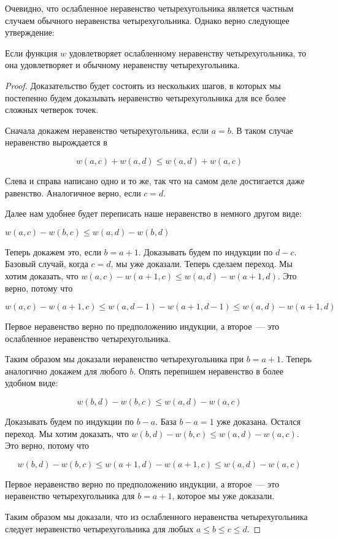 Очевидно, что ослабленное неравенство четырехугольника является частным случаем обычного неравенства четырехугольника. Однако верно следующее утверждение:

\begin{proposition}
    Если функция $w$ удовлетворяет ослабленному неравенству четырехугольника, то она удовлетворяет и обычному неравенству четырехугольника.
\end{proposition}

\begin{proof}
    Доказательство будет состоять из нескольких шагов, в которых мы постепенно будем доказывать неравенство четырехугольника для все более сложных четверок точек.

    Сначала докажем неравенство четырехугольника, если $a = b$. В таком случае неравенство вырождается в

    $$w(a, c) + w(a, d) \le w(a, d) + w(a, c)$$

    Слева и справа написано одно и то же, так что на самом деле достигается даже равенство. Аналогичное верно, если $c = d$.

    Далее нам удобнее будет переписать наше неравенство в немного другом виде:

    $w(a, c) - w(b, c) \le w(a, d) - w(b, d)$

    Теперь докажем это, если $b = a + 1$. Доказывать будем по индукции по $d - c$. Базовый случай, когда $c = d$, мы уже доказали. Теперь сделаем переход. Мы хотим доказать, что $w(a, c) - w(a + 1, c) \le w(a, d) - w(a + 1, d)$. Это верно, потому что

$$w(a, c) - w(a + 1, c) \le w(a, d - 1) - w(a + 1, d - 1) \le w(a, d) - w(a + 1, d)$$

Первое неравенство верно по предположению индукции, а второе~--- это ослабленное неравенство четырехугольника.

Таким образом мы доказали неравенство четырехугольника при $b = a + 1$. Теперь аналогично докажем для любого $b$. Опять перепишем неравенство в более удобном виде:

$$w(b, d) - w(b, c) \le w(a, d) - w(a, c)$$

Доказывать будем по индукции по $b - a$. База $b - a = 1$ уже доказана. Остался переход. Мы хотим доказать, что $w(b, d) - w(b, c) \le w(a, d) - w(a, c)$. Это верно, потому что

$$w(b, d) - w(b, c) \le w(a + 1, d) - w(a + 1, c) \le w(a, d) - w(a, c)$$

Первое неравенство верно по предположению индукции, а второе~--- это неравенство четырехугольника для $b = a + 1$, которое мы уже доказали.

Таким образом мы доказали, что из ослабленного неравенства четырехугольника следует неравенство четырехугольника для любых $a \le b \le c \le d$.
\end{proof}

